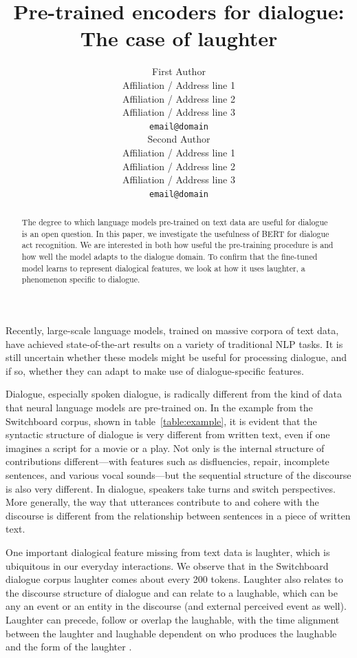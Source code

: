 \documentclass[11pt,a4paper]{article}
\title{Pre-trained encoders for dialogue: The case of laughter}
\author{First Author \\
  Affiliation / Address line 1 \\
  Affiliation / Address line 2 \\
  Affiliation / Address line 3 \\
  \texttt{email@domain} \\\And
  Second Author \\
  Affiliation / Address line 1 \\
  Affiliation / Address line 2 \\
  Affiliation / Address line 3 \\
  \texttt{email@domain} \\}
\date{}
\begin{document}
\maketitle
\begin{abstract}
  The degree to which language models pre-trained on text data are useful for dialogue is an open question.
  In this paper, we investigate the usefulness of BERT for dialogue act recognition.
  We are interested in both how useful the pre-training procedure is and 
  how well the model adapts to the dialogue domain.
  To confirm that the fine-tuned model learns to represent dialogical features, 
  we look at how it uses laughter, a phenomenon specific to dialogue.
\end{abstract}


Recently, large-scale language models, trained on massive corpora of text data, have achieved state-of-the-art results on a variety of traditional NLP tasks.
It is still uncertain whether these models might be useful for processing dialogue, and if so, whether they can adapt to make use of dialogue-specific features.

Dialogue, especially spoken dialogue, is radically different from the kind of data that neural language models are pre-trained on.
In the example from the Switchboard corpus, shown in table~\ref{table:example}, it is evident that the syntactic structure of dialogue is very different from  written text, even if one imagines a script for a movie or a play.
Not only is the internal structure of contributions different---with features such as disfluencies, repair, incomplete sentences, and various vocal sounds---but the sequential structure of the discourse is also very different.
In dialogue, speakers take turns and switch perspectives.
More generally, the way that utterances contribute to and cohere with the discourse is different from the relationship between sentences in a piece of written text.

One important dialogical feature missing from text data is laughter, which is ubiquitous in our everyday interactions.
We observe that in the Switchboard dialogue corpus laughter comes about every 200 tokens.
Laughter also relates to the discourse structure of dialogue and can relate to a laughable, which can be any an event or an entity in the discourse (and external perceived event as well).
Laughter can precede, follow or overlap the laughable, with the time alignment between the laughter and laughable dependent on who produces the laughable and the form of the laughter \citep{tian2016we}.
\end{document}
